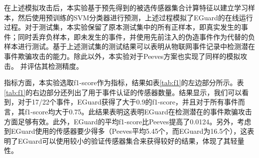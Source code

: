 在上述模拟攻击后，本实验基于预先得到的被选传感器集合计算特征以建立学习样本，然后使用预训练的SVM分类器进行预测，上述过程模拟了EGuard的在线运行过程。对于测试集，本实验保留了原本测试集中的所有正样本，即真实发生的事件；同时丢弃负样本，即未发生的事件，并使用先前注入的伪造事件作为代替的负样本进行测试。基于上述测试集的测试结果可以表明从物联网事件记录中检测潜在事件欺骗攻击的能力。除此以外，本实验对于Peeves方案也实现了同样的模拟攻击。
并评估其检测精度。

指标方面，本实验选取f1-score作为指标，结果如表\ref{tab:f1}的左边部分所示。表\ref{tab:f1}的右边部分还列出了用于事件认证的传感器数量。结果显示，我们可以看到，对于17/22个事件，EGuard获得了大于0.9的f1-score，并且对于所有事件而言，其f1-score均大于0.75。此结果表明这表明EGuard在检测潜在的事件欺骗攻击方面足够有效。此外，EGuard的平均f1-score比Peeves提高了0.0124。另外，考虑到EGuard使用的传感器要少得多（Peeves平均5.45个，而EGuard为16.5个），这表明了EGuard可以使用较小的验证传感器集合来获得较好的结果，体现了其轻量性。

